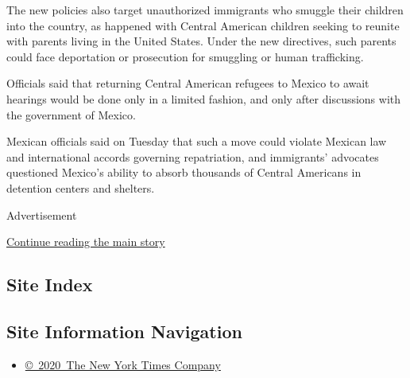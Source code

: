The new policies also target unauthorized immigrants who smuggle their
children into the country, as happened with Central American children
seeking to reunite with parents living in the United States. Under the
new directives, such parents could face deportation or prosecution for
smuggling or human trafficking.

Officials said that returning Central American refugees to Mexico to
await hearings would be done only in a limited fashion, and only after
discussions with the government of Mexico.

Mexican officials said on Tuesday that such a move could violate Mexican
law and international accords governing repatriation, and immigrants'
advocates questioned Mexico's ability to absorb thousands of Central
Americans in detention centers and shelters.

Advertisement

\protect\hyperlink{after-bottom}{Continue reading the main story}

\hypertarget{site-index}{%
\subsection{Site Index}\label{site-index}}

\hypertarget{site-information-navigation}{%
\subsection{Site Information
Navigation}\label{site-information-navigation}}

\begin{itemize}
\tightlist
\item
  \href{https://help.nytimes.com/hc/en-us/articles/115014792127-Copyright-notice}{©~2020~The
  New York Times Company}
\end{itemize}

